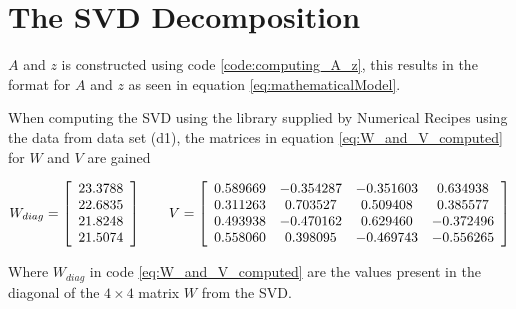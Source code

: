 \section{The SVD Decomposition}

$A$ and $z$ is constructed using code \ref{code:computing_A_z}, this results in the format for $A$ and $z$ as seen in equation \ref{eq:mathematicalModel}.



When computing the SVD using the library supplied by Numerical Recipes using the data from data set (d1), the matrices in equation \ref{eq:W_and_V_computed} for $W$ and $V$ are gained

\begin{equation}
W_{diag} = 
\left[
\begin{array}{c}
23.3788 \\
22.6835 \\
21.8248 \\
21.5074
\end{array}
\right]
\qquad
V = 
\left[
\begin{array}{c c c c}
0.589669 & -0.354287 & -0.351603 & 0.634938 \\
0.311263 & 0.703527 & 0.509408 & 0.385577 \\
0.493938 & -0.470162 & 0.629460 & -0.372496 \\
0.558060 & 0.398095 & -0.469743 & -0.556265
\end{array}
\right]
\label{eq:W_and_V_computed}
\end{equation}

Where $W_{diag}$ in code \ref{eq:W_and_V_computed} are the values present in the diagonal of the $4 \times 4$ matrix $W$ from the SVD.